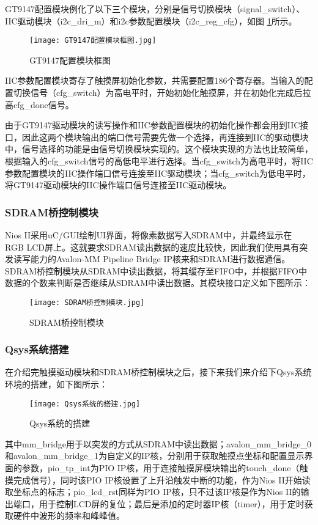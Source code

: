 \documentclass[lang=cn,a4paper,newtx]{elegantpaper}
\begin{document}
GT9147配置模块例化了以下三个模块，分别是信号切换模块（signal\_switch）、IIC驱动模块（i2c\_dri\_m）和i2c参数配置模块（i2c\_reg\_cfg），如图 \ref{GT9147配置模块框图}所示。
  \begin{figure}[!htb]
	\centering
	\caption{GT9147配置模块框图}
	\label{GT9147配置模块框图}
	\texttt{[image: GT9147配置模块框图.jpg]}
\end{figure}


IIC参数配置模块寄存了触摸屏初始化参数，共需要配置186个寄存器。当输入的配置切换信号（cfg\_switch）为高电平时，开始初始化触摸屏，并在初始化完成后拉高cfg\_done信号。

由于GT9147驱动模块的读写操作和IIC参数配置模块的初始化操作都会用到IIC接口，因此这两个模块输出的端口信号需要先做一个选择，再连接到IIC的驱动模块中，信号选择的功能是由信号切换模块实现的。这个模块实现的方法也比较简单，根据输入的cfg\_switch信号的高低电平进行选择。当cfg\_switch为高电平时，将IIC参数配置模块的IIC操作端口信号连接至IIC驱动模块；当cfg\_switch为低电平时，将GT9147驱动模块的IIC操作端口信号连接至IIC驱动模块。

\subsubsection{SDRAM桥控制模块}
Nios II采用uC/GUI绘制UI界面，将像素数据写入SDRAM中，并最终显示在 RGB LCD屏上。这就要求SDRAM读出数据的速度比较快，因此我们使用具有突发读写能力的Avalon-MM Pipeline Bridge IP核来和SDRAM进行数据通信。SDRAM桥控制模块从SDRAM中读出数据，将其缓存至FIFO中，并根据FIFO中数据的个数来判断是否继续从SDRAM中读出数据。其模块接口定义如下图所示：
  \begin{figure}[!htb]
	\centering
	\caption{SDRAM桥控制模块}
	\label{SDRAM桥控制模块}
	\texttt{[image: SDRAM桥控制模块.jpg]}
\end{figure}

\subsubsection{Qsys系统搭建}
在介绍完触摸驱动模块和SDRAM桥控制模块之后，接下来我们来介绍下Qsys系统环境的搭建，如下图所示：
  \begin{figure}[!htb]
	\centering
	\caption{Qsys系统的搭建}
	\label{Qsys系统的搭建}
	\texttt{[image: Qsys系统的搭建.jpg]}
\end{figure}
其中mm\_bridge用于以突发的方式从SDRAM中读出数据；avalon\_mm\_bridge\_0和avalon\_mm\_bridge\_1为自定义的IP核，分别用于获取触摸点坐标和配置显示界面的参数，pio\_tp\_int为PIO IP核，用于连接触摸屏模块输出的touch\_done（触摸完成信号），同时该PIO IP核设置了上升沿触发中断的功能，作为Nios II开始读取坐标点的标志；pio\_lcd\_rst同样为PIO IP核，只不过该IP核是作为Nios II的输出端口，用于控制LCD屏的复位；最后是添加的定时器IP核（timer），用于定时获取硬件中波形的频率和峰峰值。
\end{document}
